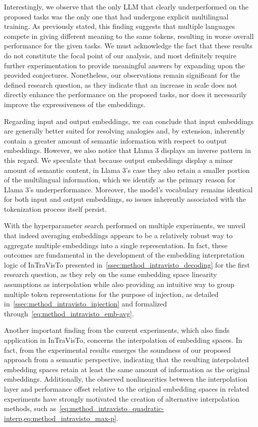 Interestingly, we observe that the only LLM that clearly underperformed on the proposed tasks was the only one that had undergone explicit multilingual training.
As previously stated, this finding suggests that multiple languages compete in giving different meaning to the same tokens, resulting in worse overall performance for the given tasks.
We must acknowledge the fact that these results do not constitute the focal point of our analysis, and most definitely require further experimentation to provide meaningful answers by expanding upon the provided conjectures.
Nonetheless, our observations remain significant for the defined research question, as they indicate that an increase in scale does not directly enhance the performance on the proposed tasks, nor does it necessarily improve the expressiveness of the embeddings.

Regarding input and output embeddings, we can conclude that input embeddings are generally better suited for resolving analogies and, by extension, inherently contain a greater amount of semantic information with respect to output embeddings.
However, we also notice that Llama 3 displays an inverse pattern in this regard.
We speculate that because output embeddings display a minor amount of semantic content, in Llama 3's case they also retain a smaller portion of the multilingual information, which we identify as the primary reason for Llama 3's underperformance.
Moreover, the model's vocabulary remains identical for both  input and output embeddings, so issues inherently associated with the tokenization process itself persist.

With the hyperparameter search performed on multiple experiments, we unveil that indeed averaging embeddings appears to be a relatively robust way to aggregate multiple embeddings into a single representation.
In fact, these outcomes are fundamental in the development of the embedding interpretation logic of InTraVisTo presented in~\cref{ssec:method_intravisto_decoding} for the first research question, as they rely on the same embedding space linearity assumptions as interpolation while also providing an intuitive way to group multiple token representations for the purpose of injection, as detailed in~\cref{ssec:method_intravisto_injection} and formalized through~\cref{eq:method_intravisto_emb-avg}.

Another important finding from the current experiments, which also finds application in InTraVisTo, concerns the interpolation of embedding spaces.
In fact, from the experimental results emerges the soundness of our proposed approach from a semantic perspective, indicating that the resulting interpolated embedding spaces retain at least the same amount of information as the original embeddings.
Additionally, the observed nonlinearities between the interpolation layer and performance offset relative to the original embedding spaces in related experiments have strongly motivated the creation of alternative interpolation methods, such as~\cref{eq:method_intravisto_quadratic-interp,eq:method_intravisto_max-p}.

